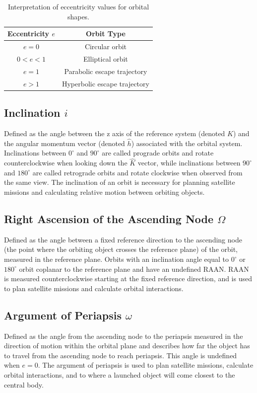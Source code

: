 \documentclass[linenumbers,trackchanges,astrosymb,]{aastex7}
\begin{document}
\begin{table}[ht!]
\centering
\caption{Interpretation of eccentricity values for orbital shapes.}
\label{tab:eccentricity_types}
\begin{tabular}{cc}
\hline
\textbf{Eccentricity $e$} & \textbf{Orbit Type} \\
\hline
$e = 0$ & Circular orbit \\
$0 < e < 1$ & Elliptical orbit \\
$e = 1$ & Parabolic escape trajectory \\
$e > 1$ & Hyperbolic escape trajectory \\
\hline
\end{tabular}
\end{table}

\subsection{Inclination $i$}
Defined as the angle between the z axis of the reference system (denoted $\hat{K}$) and the angular momentum vector (denoted $\hat{h}$) associated with the orbital system. Inclinations between $0^\circ$ and $90^\circ$ are called prograde orbits and rotate counterclockwise when looking down the $\hat{K}$ vector, while inclinations between $90^\circ$ and $180^\circ$ are called retrograde orbits and rotate clockwise when observed from the same view. The inclination of an orbit is necessary for planning satellite missions and calculating relative motion between orbiting objects. 

\subsection{Right Ascension of the Ascending Node $\Omega$}
Defined as the angle between a fixed reference direction to the ascending node (the point where the orbiting object crosses the reference plane) of the orbit, measured in the reference plane. Orbits with an inclination angle equal to $0^\circ$ or $180^\circ$ orbit coplanar to the reference plane and have an undefined RAAN. RAAN is measured counterclockwise starting at the fixed reference direction, and is used to plan satellite missions and calculate orbital interactions.  

\subsection{Argument of Periapsis $\omega$}
Defined as the angle from the ascending node to the periapsis measured in the direction of motion within the orbital plane and describes how far the object has to travel from the ascending node to reach periapsis. This angle is undefined when $e = 0$. The argument of periapsis is used to plan satellite missions, calculate orbital interactions, and to where a launched object will come closest to the central body.
\end{document}
